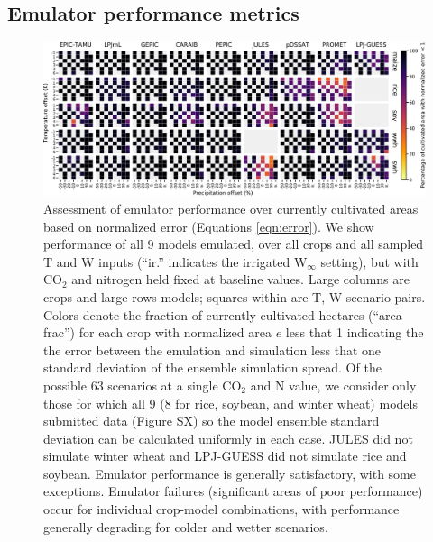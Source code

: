 \documentclass[gmd, manuscript]{copernicus} %
\begin{document}
\subsection{Emulator performance metrics}
\label{S:4.1}
\begin{figure}[ht]
\centering
    \includegraphics[width=16.3cm]{figures/error_grid.png}
    \caption{
    Assessment of emulator performance over currently cultivated areas based on normalized error (Equations \ref{eqn:error}). 
    We show performance of all 9 models emulated, over all crops and all sampled T and W inputs (``ir.'' indicates the irrigated W$_{\infty}$ setting), but with CO$_2$ and nitrogen held fixed at baseline values. 
    Large columns are crops and large rows models; squares within are T, W scenario pairs. 
    Colors denote the fraction of currently cultivated hectares (``area frac'') for each crop with normalized area $e$ less that 1 indicating the the error between the emulation and simulation less that one standard deviation of the ensemble simulation spread. 
    Of the possible 63 scenarios at a single CO$_2$ and N value, we consider only those for which all 9 (8 for rice, soybean, and winter wheat) models submitted data (Figure SX) so the model ensemble standard deviation can be calculated uniformly in each case. 
    JULES did not simulate winter wheat and LPJ-GUESS did not simulate rice and soybean. Emulator performance is generally satisfactory, with some exceptions. 
    Emulator failures (significant areas of poor performance) occur for individual crop-model combinations, with performance generally degrading for colder and wetter scenarios.
    }
   \label{fig:error_360}
\end{figure}
\end{document}
